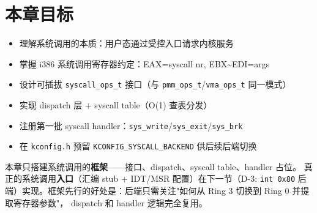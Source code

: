 \section{本章目标}

\begin{itemize}
  \item 理解系统调用的本质：用户态通过受控入口请求内核服务
  \item 掌握 i386 系统调用寄存器约定：EAX=syscall nr, EBX\textasciitilde EDI=args
  \item 设计可插拔 \texttt{syscall\_ops\_t} 接口（与 \texttt{pmm\_ops\_t}/\texttt{vma\_ops\_t} 同一模式）
  \item 实现 dispatch 层 + syscall table（O(1) 查表分发）
  \item 注册第一批 syscall handler：\texttt{sys\_write}/\texttt{sys\_exit}/\texttt{sys\_brk}
  \item 在 \texttt{kconfig.h} 预留 \texttt{KCONFIG\_SYSCALL\_BACKEND} 供后续后端切换
\end{itemize}

\begin{designbox}
本章只搭建系统调用的\textbf{框架}——接口、dispatch、syscall table、handler 占位。
真正的系统调用\textbf{入口}（汇编 stub + IDT/MSR 配置）在下一节（D-3: \texttt{int 0x80}
后端）实现。框架先行的好处是：后端只需关注"如何从 Ring 3 切换到 Ring 0 并提取寄存器参数"，
dispatch 和 handler 逻辑完全复用。
\end{designbox}
